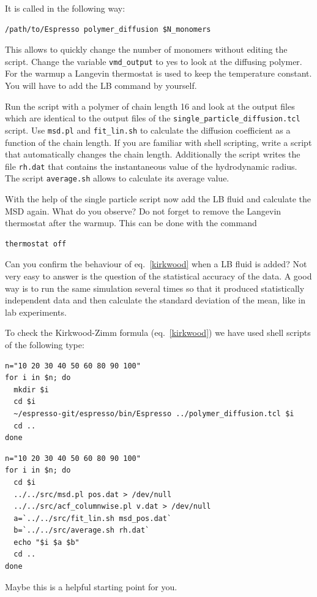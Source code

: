 It is called in the following way:
{\vspace{0,2cm}\small
\begin{lstlisting}[numbers=none]
/path/to/Espresso polymer_diffusion $N_monomers  
\end{lstlisting}\vspace{0,2cm}
}
This allows to quickly change the number of monomers without editing 
the script. Change the variable  \lstinline|vmd_output| to yes to 
look at the diffusing polymer.
For the warmup a Langevin thermostat is used to keep the temperature constant.
You will have to add the LB command by yourself.

Run the script with a polymer of chain length 16 and look at the output files
which are identical to the output files of the 
\lstinline|single_particle_diffusion.tcl|
script. 
Use \lstinline|msd.pl| and \lstinline|fit_lin.sh| to calculate the diffusion
coefficient as a function of the chain length. If you are familiar with
shell scripting, write a script that automatically changes the chain length.
Additionally the script writes the file \lstinline|rh.dat| that contains the
instantaneous value of the hydrodynamic radius. The script \lstinline|average.sh|
allows to calculate its average value.

With the help of the single particle script now add the LB fluid and calculate
the MSD again. What do you observe? Do not forget to remove the Langevin 
thermostat after the warmup. This can be done with the command
{\vspace{0,2cm}\small
\begin{lstlisting}[numbers=none]
thermostat off
\end{lstlisting}\vspace{0,2cm}
} 
Can you confirm the behaviour of eq.~\ref{kirkwood} when a LB fluid is added?
Not very easy to answer is the question of the statistical accuracy of the
data. A good way is to run the same simulation several times so that it produced
statistically independent data and then calculate the standard deviation of
the mean, like in lab experiments.


To check the Kirkwood-Zimm formula (eq.~\ref{kirkwood}) we have used shell 
scripts of the following type:
{\vspace{0,2cm}\small
\begin{lstlisting}[numbers=none]
n="10 20 30 40 50 60 80 90 100"
for i in $n; do
  mkdir $i 
  cd $i
  ~/espresso-git/espresso/bin/Espresso ../polymer_diffusion.tcl $i
  cd ..
done
\end{lstlisting}\vspace{0,2cm}
} 
{\vspace{0,2cm}\small
\begin{lstlisting}[numbers=none]
n="10 20 30 40 50 60 80 90 100"
for i in $n; do
  cd $i
  ../../src/msd.pl pos.dat > /dev/null
  ../../src/acf_columnwise.pl v.dat > /dev/null
  a=`../../src/fit_lin.sh msd_pos.dat`
  b=`../../src/average.sh rh.dat`
  echo "$i $a $b"
  cd ..
done
\end{lstlisting}\vspace{0,2cm}
} 
Maybe this is a helpful starting point for you. 
